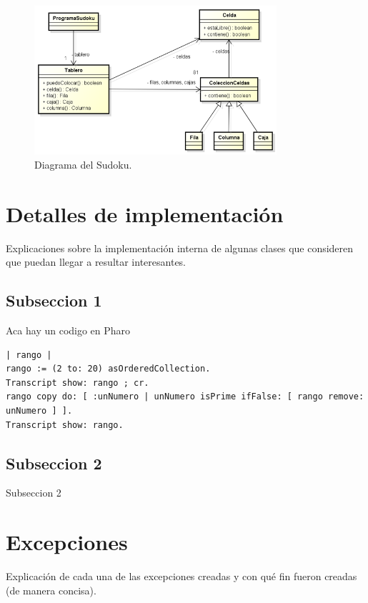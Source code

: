 \documentclass[titlepage,a4paper]{article}
\begin{document}
\begin{figure}[H]
\centering
\includegraphics[width=0.8\textwidth]{diagrama_clase01.png}
\caption{\label{fig:class01}Diagrama del Sudoku.}
\end{figure}

\section{Detalles de implementación}\label{sec:implementacion}
Explicaciones sobre la implementación interna de algunas clases que consideren que puedan llegar a resultar interesantes. 

\subsection{Subseccion 1}
Aca hay un codigo en Pharo

\begin{verbatim}
| rango |
rango := (2 to: 20) asOrderedCollection.
Transcript show: rango ; cr.
rango copy do: [ :unNumero | unNumero isPrime ifFalse: [ rango remove: unNumero ] ].
Transcript show: rango.
\end{verbatim}

\subsection{Subseccion 2}
Subseccion 2

\section{Excepciones}\label{sec:excepciones}

Explicación de cada una de las excepciones creadas y con qué fin fueron creadas (de manera concisa). 
\end{document}

